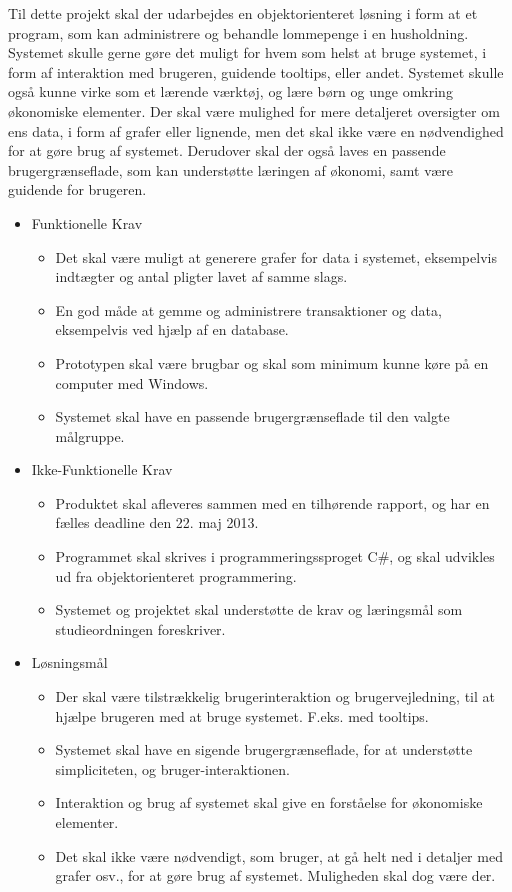 Til dette projekt skal der udarbejdes en objektorienteret løsning i form at et program, som kan administrere og behandle lommepenge i en husholdning. Systemet skulle gerne gøre det muligt for hvem som helst at bruge systemet, i form af interaktion med brugeren, guidende tooltips, eller andet. Systemet skulle også kunne virke som et lærende værktøj, og lære børn og unge omkring økonomiske elementer. Der skal være mulighed for mere detaljeret oversigter om ens data, i form af grafer eller lignende, men det skal ikke være en nødvendighed for at gøre brug af systemet. Derudover skal der også laves en passende brugergrænseflade, som kan understøtte læringen af økonomi, samt være guidende for brugeren.

\begin{itemize}
	\item Funktionelle Krav
	\begin{itemize}
		\item Det skal være muligt at generere grafer for data i systemet, eksempelvis indtægter og antal pligter lavet af samme slags.
		\item En god måde at gemme og administrere transaktioner og data, eksempelvis ved hjælp af en database.
		\item Prototypen skal være brugbar og skal som minimum kunne køre på en computer med Windows.
		\item Systemet skal have en passende brugergrænseflade til den valgte målgruppe.
	\end{itemize}
	\item Ikke-Funktionelle Krav
	\begin{itemize}
		\item Produktet skal afleveres sammen med en tilhørende rapport, og har en fælles deadline den 22. maj 2013.
		\item Programmet skal skrives i programmeringssproget C\#, og skal udvikles ud fra objektorienteret programmering.
		\item Systemet og projektet skal understøtte de krav og læringsmål som studieordningen foreskriver.
	\end{itemize}
	\item Løsningsmål
	\begin{itemize}
		\item Der skal være tilstrækkelig brugerinteraktion og brugervejledning, til at hjælpe brugeren med at bruge systemet. F.eks. med tooltips.
		\item Systemet skal have en sigende brugergrænseflade, for at understøtte simpliciteten, og bruger-interaktionen.
		\item Interaktion og brug af systemet skal give en forståelse for økonomiske elementer.
		\item Det skal ikke være nødvendigt, som bruger, at gå helt ned i detaljer med grafer osv., for at gøre brug af systemet. Muligheden skal dog være der.
	\end{itemize}
\end{itemize}
